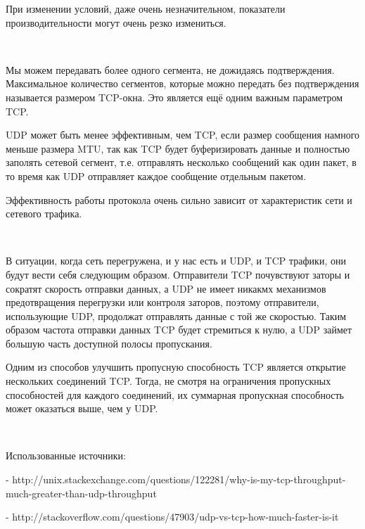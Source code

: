 \documentclass{article}
\begin{document}
При изменении условий, даже очень незначительном, показатели производительности могут очень резко измениться.

~\

Мы можем передавать более одного сегмента, не дожидаясь подтверждения. Максимальное количество сегментов, которые можно передать без подтверждения называется размером TCP-окна. Это является ещё одним важным параметром TCP.

\newpage

UDP может быть менее эффективным, чем TCP, если размер сообщения намного меньше размера MTU, так как TCP будет буферизировать данные и полностью заполять сетевой сегмент, т.е. отправлять несколько сообщений как один пакет, в то время как UDP отправляет каждое сообщение отдельным пакетом.

Эффективность работы протокола очень сильно зависит от характеристик сети и сетевого трафика.

~\

В ситуации, когда сеть перегружена, и у нас есть и UDP, и TCP трафики, они будут вести себя следующим образом. Отправители TCP почувствуют заторы и сократят скорость отправки данных, а UDP не имеет никакмх механизмов предотвращения перегрузки или контроля заторов, поэтому отправители, использующие UDP, продолжат отправлять данные с той же скоростью. Таким образом частота отправки данных TCP будет стремиться к нулю, а UDP займет большую часть доступной полосы пропускания.

Одним из способов улучшить пропусную способность TCP является открытие нескольких соединений TCP. Тогда, не смотря на ограничения пропускных способностей для каждого соединений, их суммарная пропускная способность может оказаться выше, чем у UDP.

~\

Использованные источники:

- http://unix.stackexchange.com/questions/122281/why-is-my-tcp-throughput-much-greater-than-udp-throughput

- http://stackoverflow.com/questions/47903/udp-vs-tcp-how-much-faster-is-it
\end{document}
